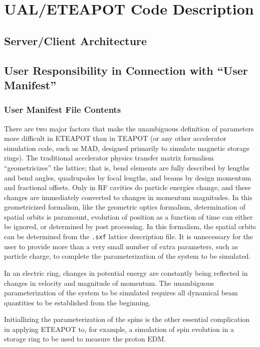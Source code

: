 \documentclass[]{article}
\begin{document}
\section{UAL/ETEAPOT Code Description}
\subsection{Server/Client Architecture}
\subsection{User Responsibility in Connection with ``User Manifest''}
\subsubsection{User Manifest File Contents}
There are two major factors that make the unambiguous definition
of parameters more difficult in ETEAPOT than in TEAPOT (or any 
other accelerator simulation code, such as MAD, designed primarily
to simulate magnetic storage rings). The traditional accelerator
physics transfer matrix formalism ``geometricizes'' the lattice;
that is, bend elements are fully described by lengths and bend
angles, quadrupoles by focal lengths, and beams by design momentum
and fractional offsets. Only in RF cavities do particle energies
change, and these changes are immediately converted to changes
in momentum magnitudes. In this geometricized formalism, like
the geometric optics formalism, determination of spatial orbits 
is paramount, evolution of position as a function of time can
either be ignored, or determined by post processing. In this
formalism, the spatial orbits can be determined from the
{\tt .sxf} lattice description file. It is unnecessary for
the user to provide more than a very small number of extra
parameters, such as particle charge, to complete the parameterization
of the system to be simulated. 

In an electric ring, changes in potential energy are constantly
being reflected in changes in velocity and magnitude of momentum.
The unambiguous parameterization of the system to be simulated
requires all dynamical beam quantities to be established from the
beginning.

Initiallizing the parameterization of the spins is the other 
essential complication in applying ETEAPOT to, for example, a
simulation of spin evolution in a storage ring to be used
to measure the proton EDM.
\end{document}
